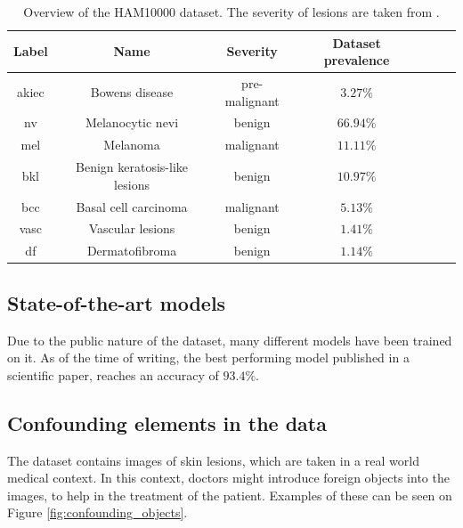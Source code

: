 \begin{table}[ht]
\begin{center}
\begin{tabular}{|c|c|c|c|c|c|c|}
\hline
Label    & Name                          & Severity      & Dataset prevalence \\ \hline
akiec    & Bowens disease                & pre-malignant & $3.27\%$           \\ \hline
nv       & Melanocytic nevi              & benign        & $66.94\%$          \\ \hline
mel      & Melanoma                      & malignant     & $11.11\%$          \\ \hline
bkl      & Benign keratosis-like lesions & benign        & $10.97\%$          \\ \hline
bcc      & Basal cell carcinoma          & malignant     & $5.13\%$           \\ \hline
vasc     & Vascular lesions              & benign        & $1.41\%$           \\ \hline
df       & Dermatofibroma                & benign        & $1.14\%$           \\ \hline
\end{tabular}
\end{center}

\caption{Overview of the HAM10000 dataset. The severity of lesions are taken from \cite{dermatologi-laerebogen}.}
\label{table:ham10000}
\end{table}

\subsection{State-of-the-art models}\label{sec:state-of-the-art}
Due to the public nature of the dataset, many different models have been trained on it.
As of the time of writing, the best performing model published in a scientific paper,
reaches an accuracy of $93.4\%$\cite{datta2021soft}.

\subsection{Confounding elements in the data} \label{sec:confounding}
The dataset contains images of skin lesions, which are taken in a real world medical context.
In this context, doctors might introduce foreign objects into the images,
to help in the treatment of the patient.
Examples of these can be seen on Figure \ref{fig:confounding_objects}.

